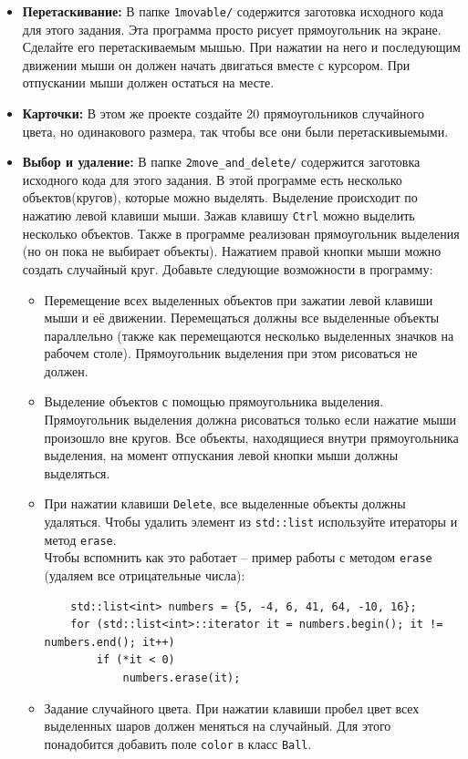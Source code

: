 \documentclass{article}
\begin{document}
\begin{itemize}
\item \textbf{Перетаскивание:} В папке \texttt{1movable/} содержится заготовка исходного кода для этого задания. Эта программа просто рисует прямоугольник на экране. Сделайте его перетаскиваемым мышью. При нажатии на него и последующим движении мыши он должен начать двигаться вместе с курсором. При отпускании мыши должен остаться на месте.

\item \textbf{Карточки:} В этом же проекте создайте 20 прямоугольников случайного цвета, но одинакового размера, так чтобы все они были перетаскивыемыми.

\item \textbf{Выбор и удаление:} В папке \texttt{2move\_and\_delete/} содержится заготовка исходного кода для этого задания. В этой программе есть несколько объектов(кругов), которые можно выделять. Выделение происходит по нажатию левой клавиши мыши. Зажав клавишу \texttt{Ctrl} можно выделить несколько объектов. Также в программе реализован прямоугольник выделения (но он пока не выбирает объекты). Нажатием правой кнопки мыши можно создать случайный круг. Добавьте следующие возможности в программу:
	\begin{itemize}
	\item Перемещение всех выделенных объектов при зажатии левой клавиши мыши и её движении. Перемещаться должны все выделенные объекты параллельно (также как перемещаются несколько выделенных значков на рабочем столе). Прямоугольник выделения при этом рисоваться не должен.
	\item Выделение объектов с помощью прямоугольника выделения. Прямоугольник выделения должна рисоваться только если нажатие мыши произошло вне кругов. Все объекты, находящиеся внутри прямоугольника выделения, на момент отпускания левой кнопки мыши должны выделяться.
	\item При нажатии клавиши \texttt{Delete}, все выделенные объекты должны удаляться. Чтобы удалить элемент из \texttt{std::list} используйте итераторы и метод \texttt{erase}. \\
	Чтобы вспомнить как это работает -- пример работы с методом \texttt{erase} (удаляем все отрицательные числа):
	\begin{lstlisting}
	std::list<int> numbers = {5, -4, 6, 41, 64, -10, 16};
	for (std::list<int>::iterator it = numbers.begin(); it != numbers.end(); it++)
		if (*it < 0)
			numbers.erase(it);
	\end{lstlisting}
	\item Задание случайного цвета. При нажатии клавиши пробел цвет всех выделенных шаров должен меняться на случайный. Для этого понадобится добавить поле \texttt{color} в класс \texttt{Ball}. 
	\end{itemize}


\end{itemize}
\end{document}
